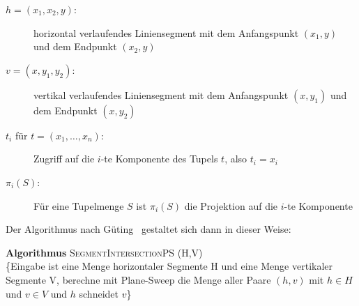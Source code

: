 \documentclass[ngerman,draft,parskip=half*,twoside]{scrreprt}
\theoremstyle{break}
\begin{document}
\begin{description}

\item[$h=(x_1,x_2,y)$:] horizontal verlaufendes Liniensegment mit dem
    Anfangspunkt $(x_1,y)$ und dem Endpunkt $(x_2,y)$
\item[$v=(x,y_1,y_2)$:] vertikal verlaufendes Liniensegment mit dem
    Anfangspunkt $(x,y_1)$ und dem Endpunkt $(x,y_2)$
\item[$t_i$ für $t=(x_1,\dots,x_n)$:] Zugriff auf die $i$-te Komponente des 
   Tupels $t$, also $t_i=x_i$
\item[$\pi_i(S)$:] Für eine Tupelmenge $S$ ist $\pi_i(S)$ die Projektion
   auf die $i$-te Komponente
\end{description} 

Der Algorithmus nach Güting~\cite{guting} gestaltet sich dann in dieser Weise:

\textbf{Algorithmus} \textsc{SegmentIntersectionPS (H,V)}\\
\{Eingabe ist eine Menge horizontaler Segmente H und eine Menge vertikaler
 Segmente V, berechne mit Plane-Sweep die Menge aller Paare $(h,v)$
mit $h{\in}H$ und $v{\in}V$ und $h$ schneidet $v$\}
\end{document}
